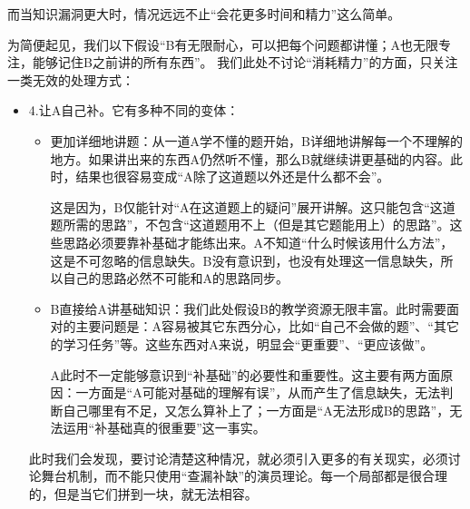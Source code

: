 而当知识漏洞更大时，情况远远不止“会花更多时间和精力”这么简单。
\begin{explain}
为简便起见，我们以下假设“B有无限耐心，可以把每个问题都讲懂；A也无限专注，能够记住B之前讲的所有东西”。
我们此处不讨论“消耗精力”的方面，只关注一类无效的处理方式：
\begin{itemize}
    \item 4.让A自己补。它有多种不同的变体：
\begin{itemize}
\item 更加详细地讲题：从一道A学不懂的题开始，B详细地讲解每一个不理解的地方。如果讲出来的东西A仍然听不懂，那么B就继续讲更基础的内容。此时，结果也很容易变成“A除了这道题以外还是什么都不会”。

这是因为，B仅能针对“A在这道题上的疑问”展开讲解。这只能包含“这道题所需的思路”，不包含“这道题用不上（但是其它题能用上）的思路”。这些思路必须要靠补基础才能练出来。A不知道“什么时候该用什么方法”，这是不可忽略的信息缺失。B没有意识到，也没有处理这一信息缺失，所以自己的思路必然不可能和A的思路同步。

\item B直接给A讲基础知识：我们此处假设B的教学资源无限丰富。此时需要面对的主要问题是：A容易被其它东西分心，比如“自己不会做的题”、“其它的学习任务”等。这些东西对A来说，明显会“更重要”、“更应该做”。

A此时不一定能够意识到“补基础”的必要性和重要性。这主要有两方面原因：一方面是“A可能对基础的理解有误”，从而产生了信息缺失，无法判断自己哪里有不足，又怎么算补上了；一方面是“A无法形成B的思路”，无法运用“补基础真的很重要”这一事实。
\insertparanotes
\end{itemize}
此时我们会发现，要讨论清楚这种情况，就必须引入更多的有关现实，必须讨论舞台机制，而不能只使用“查漏补缺”的演员理论。每一个局部都是很合理的，但是当它们拼到一块，就无法相容。\end{itemize}
\end{explain}
